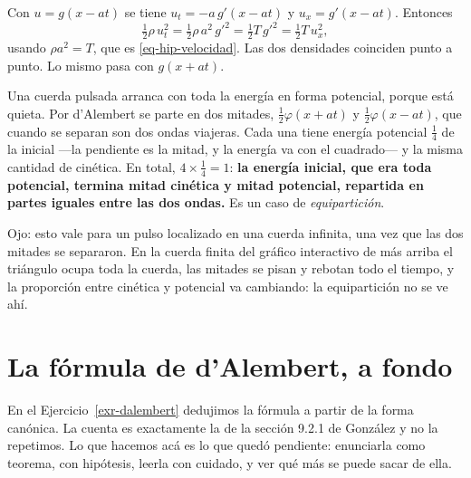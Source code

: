 \documentclass[
  spanish,
  a4paper,
]{scrbook}
\theoremstyle{definition}
\theoremstyle{plain}
\theoremstyle{definition}
\theoremstyle{plain}
\theoremstyle{definition}
\theoremstyle{remark}
\begin{document}
\begin{tcolorbox}[enhanced jigsaw, arc=.35mm, bottomrule=.15mm, bottomtitle=1mm, breakable, colback=white, colbacktitle=quarto-callout-tip-color!10!white, colframe=quarto-callout-tip-color-frame, coltitle=black, left=2mm, leftrule=.75mm, opacityback=0, opacitybacktitle=0.6, rightrule=.15mm, title=\textcolor{quarto-callout-tip-color}{\faLightbulb}\hspace{0.5em}{Solución}, titlerule=0mm, toprule=.15mm, toptitle=1mm]

Con \(u = g(x-at)\) se tiene \(u_t = -a\,g'(x-at)\) y
\(u_x = g'(x-at)\). Entonces \[
\tfrac12\rho\,u_t^2 = \tfrac12\rho\,a^2\,g'^2 = \tfrac12 T\,g'^2 = \tfrac12 T\,u_x^2 ,
\] usando \(\rho a^2 = T\), que es \ref{eq-hip-velocidad}. Las dos
densidades coinciden punto a punto. Lo mismo pasa con \(g(x+at)\).

Una cuerda pulsada arranca con toda la energía en forma potencial,
porque está quieta. Por d'Alembert se parte en dos mitades,
\(\tfrac12\varphi(x+at)\) y \(\tfrac12\varphi(x-at)\), que cuando se
separan son dos ondas viajeras. Cada una tiene energía potencial
\(\tfrac14\) de la inicial ---la pendiente es la mitad, y la energía va
con el cuadrado--- y la misma cantidad de cinética. En total,
\(4\times\tfrac14 = 1\): \textbf{la energía inicial, que era toda
potencial, termina mitad cinética y mitad potencial, repartida en partes
iguales entre las dos ondas.} Es un caso de \emph{equipartición}.

Ojo: esto vale para un pulso localizado en una cuerda infinita, una vez
que las dos mitades se separaron. En la cuerda finita del gráfico
interactivo de más arriba el triángulo ocupa toda la cuerda, las mitades
se pisan y rebotan todo el tiempo, y la proporción entre cinética y
potencial va cambiando: la equipartición no se ve ahí.

\end{tcolorbox}

\section{La fórmula de d'Alembert, a fondo}\label{sec-hip-dalembert}

En el Ejercicio~\ref{exr-dalembert} dedujimos la fórmula a partir de la
forma canónica. La cuenta es exactamente la de la sección 9.2.1 de
González y no la repetimos. Lo que hacemos acá es lo que quedó
pendiente: enunciarla como teorema, con hipótesis, leerla con cuidado, y
ver qué más se puede sacar de ella.
\end{document}
